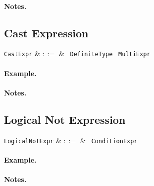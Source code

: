 \paragraph{Notes.}


\subsection{Cast Expression}
\label{c_expr_cast}

\begin{syntax}
\verb+CastExpr+ & $::=$ & \token{(}\ \verb+DefiniteType+ \token{)}\ \verb+MultiExpr+\\
\end{syntax}

\paragraph{Example.}

\paragraph{Notes.}


\subsection{Logical Not Expression}
\label{c_expr_logical_not}

\begin{syntax}
\verb+LogicalNotExpr+ & $::=$ & \token{!}\ \verb+ConditionExpr+\\
\end{syntax}

\paragraph{Example.}

\paragraph{Notes.}


